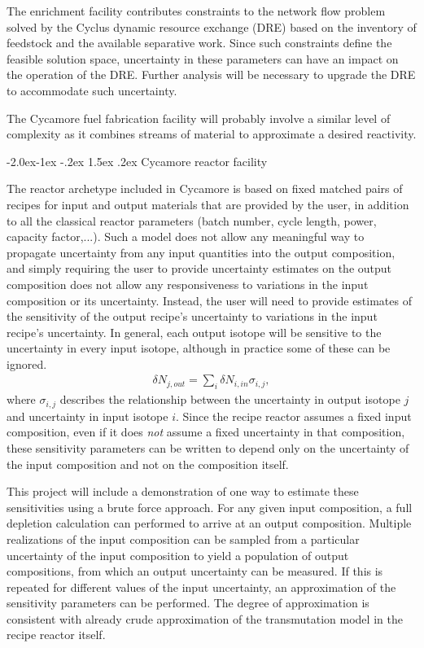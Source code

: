 \documentclass[dvips,11pt]{article}
\makeatletter
\newcommand{\unc}[1]
{ \delta #1 }
\renewcommand\subsubsection{\@startsection{subsubsection}{3}{\z@}%
                                     {-2.0ex\@plus -1ex \@minus -.2ex}%
                                     {1.5ex \@plus .2ex}%
                                     {\normalfont\bfseries}}%
\makeatother
\begin{document}
The enrichment facility contributes constraints to
the network flow problem solved by the Cyclus
dynamic resource exchange (DRE) based on the
inventory of feedstock and the available
separative work.  Since such constraints define
the feasible solution space, uncertainty in these
parameters can have an impact on the operation of
the DRE.  Further analysis will be necessary to
upgrade the DRE to accommodate such uncertainty.

The Cycamore fuel fabrication facility will
probably involve a similar level of complexity as
it combines streams of material to approximate a
desired reactivity.

\subsubsection{Cycamore reactor facility}

The reactor archetype included in Cycamore is
based on fixed matched pairs of recipes for input
and output materials that are provided by the
user, in addition to all the classical reactor
parameters (batch number, cycle length, power,
capacity factor,...).  Such a model does not allow
any meaningful way to propagate uncertainty from
any input quantities into the output composition,
and simply requiring the user to provide uncertainty 
estimates on the output composition does not allow
any responsiveness to variations in the input
composition or its uncertainty.
Instead, the user will need to provide estimates
of the sensitivity of the output recipe's uncertainty to
variations in the input recipe's uncertainty.  In
general, each output isotope will be sensitive to
the uncertainty in every input isotope, although
in practice some of these can be ignored.
\begin{align}
\unc{N_{j,out}} = \sum_i \unc{N_{i,in}} \sigma_{i,j},
\end{align}
where $\sigma_{i,j}$ describes the relationship
between the uncertainty in output isotope $j$ and
uncertainty in input isotope $i$.  Since the
recipe reactor assumes a fixed input composition,
even if it does \textit{not} assume a fixed uncertainty in
that composition, these sensitivity parameters can
be written to depend only on the uncertainty of
the input composition and not on the composition
itself.  

This project will include a demonstration of one
way to estimate these sensitivities using a brute
force approach.  For any given input composition,
a full depletion calculation can performed to
arrive at an output composition.  Multiple
realizations of the input composition can be
sampled from a particular uncertainty of the input
composition to yield a population of output
compositions, from which an output uncertainty can
be measured.  If this is repeated for different
values of the input uncertainty, an approximation
of the sensitivity parameters can be performed.
The degree of approximation is consistent with
already crude approximation of the transmutation
model in the recipe reactor itself.
\end{document}
